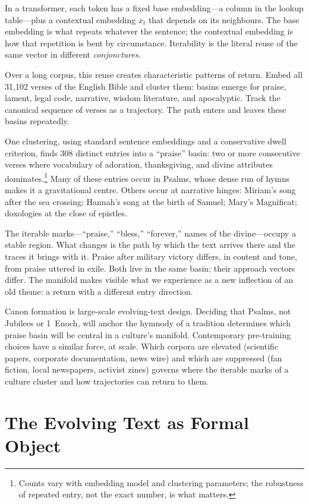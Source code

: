 \documentclass[12pt,a4paper]{article}
\begin{document}
In a transformer, each token has a fixed base embedding---a column in the lookup table---plus a contextual embedding $x_t$ that depends on its neighbours. The base embedding is what repeats whatever the sentence; the contextual embedding is how that repetition is bent by circumstance. Iterability is the literal reuse of the same vector in different \emph{conjonctures}.

Over a long corpus, this reuse creates characteristic patterns of return. Embed all 31{,}102 verses of the English Bible and cluster them: basins emerge for praise, lament, legal code, narrative, wisdom literature, and apocalyptic. Track the canonical sequence of verses as a trajectory. The path enters and leaves these basins repeatedly.

One clustering, using standard sentence embeddings and a conservative dwell criterion, finds 308 distinct entries into a ``praise'' basin: two or more consecutive verses where vocabulary of adoration, thanksgiving, and divine attributes dominates.\footnote{Counts vary with embedding model and clustering parameters; the robustness of repeated entry, not the exact number, is what matters.} Many of these entries occur in Psalms, whose dense run of hymns makes it a gravitational centre. Others occur at narrative hinges: Miriam's song after the sea crossing; Hannah's song at the birth of Samuel; Mary's Magnificat; doxologies at the close of epistles.

The iterable marks---``praise,'' ``bless,'' ``forever,'' names of the divine---occupy a stable region. What changes is the path by which the text arrives there and the traces it brings with it. Praise after military victory differs, in content and tone, from praise uttered in exile. Both live in the same basin; their approach vectors differ. The manifold makes visible what we experience as a new inflection of an old theme: a return with a different entry direction.

Canon formation is large-scale evolving-text design. Deciding that Psalms, not Jubilees or 1~Enoch, will anchor the hymnody of a tradition determines which praise basin will be central in a culture's manifold. Contemporary pre-training choices have a similar force, at scale. Which corpora are elevated (scientific papers, corporate documentation, news wire) and which are suppressed (fan fiction, local newspapers, activist zines) governs where the iterable marks of a culture cluster and how trajectories can return to them.

\section{The Evolving Text as Formal Object}
\end{document}
